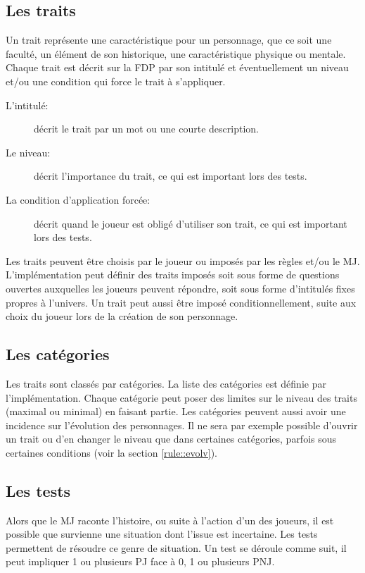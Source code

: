\documentclass[a4paper,10pt,twoside,twocolumn]{article}
\begin{document}
 \subsection{Les traits}
 \label{rule::traits}
 
 Un trait représente une caractéristique pour un personnage, que ce soit une faculté, un élément de son historique, une caractéristique physique ou mentale. Chaque trait est décrit sur la FDP par son intitulé et éventuellement un niveau et/ou une condition qui force le trait à s'appliquer.
 
 \begin{description}
  \item[L'intitulé:] décrit le trait par un mot ou une courte description.
  \item[Le niveau:] décrit l'importance du trait, ce qui est important lors des tests.
  \item[La condition d'application forcée:] décrit quand le joueur est obligé d'utiliser son trait, ce qui est important lors des tests.
 \end{description}
 
 Les traits peuvent être choisis par le joueur ou imposés par les règles et/ou le MJ. L'implémentation peut définir des traits imposés soit sous forme de questions ouvertes auxquelles les joueurs peuvent répondre, soit sous forme d'intitulés fixes propres à l'univers. Un trait peut aussi être imposé conditionnellement, suite aux choix du joueur lors de la création de son personnage.
 
 \subsection{Les catégories}
 \label{rule::cat}
 
 Les traits sont classés par catégories. La liste des catégories est définie par l'implémentation. Chaque catégorie peut poser des limites sur le niveau des traits (maximal ou minimal) en faisant partie. Les catégories peuvent aussi avoir une incidence sur l'évolution des personnages. Il ne sera par exemple possible d'ouvrir un trait ou d'en changer le niveau que dans certaines catégories, parfois sous certaines conditions (voir la section \ref{rule::evolv}).
 
 \subsection{Les tests}
 \label{rule::test}
 
 Alors que le MJ raconte l'histoire, ou suite à l'action d'un des joueurs, il est possible que survienne une situation dont l'issue est incertaine. Les tests permettent de résoudre ce genre de situation. Un test se déroule comme suit, il peut impliquer 1 ou plusieurs PJ face à 0, 1 ou plusieurs PNJ.
 
\end{document}
